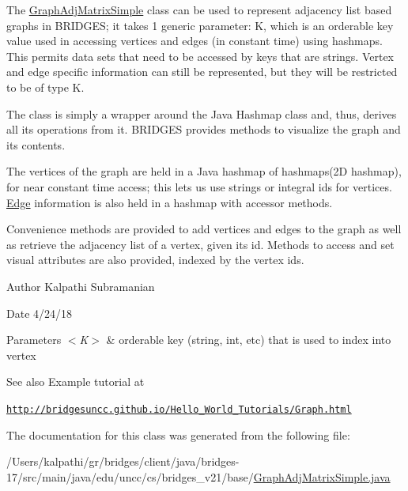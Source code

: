 The \mbox{\hyperlink{classbridges_1_1base_1_1_graph_adj_matrix_simple}{Graph\+Adj\+Matrix\+Simple}} class can be used to represent adjacency list based ~\newline
graphs in B\+R\+I\+D\+G\+ES; it takes 1 generic parameter\+: K, which is an orderable key value used in accessing vertices and edges (in constant time) using hashmaps. This permits data sets that need to be accessed by keys that are strings. Vertex and edge specific information can still be represented, but they will be restricted to be of type K.

The class is simply a wrapper around the Java Hashmap class and, thus, derives all its operations from it. B\+R\+I\+D\+G\+ES provides methods to visualize the graph and its contents.

The vertices of the graph are held in a Java hashmap of hashmaps(2\+D hashmap), for near constant time access; this lets us use strings or integral ids for vertices. \mbox{\hyperlink{classbridges_1_1base_1_1_edge}{Edge}} information is also held in a hashmap with accessor methods.

Convenience methods are provided to add vertices and edges to the graph as well as retrieve the adjacency list of a vertex, given its id. Methods to access and set visual attributes are also provided, indexed by the vertex ids.

\begin{DoxyAuthor}{Author}
Kalpathi Subramanian
\end{DoxyAuthor}
\begin{DoxyDate}{Date}
4/24/18
\end{DoxyDate}

\begin{DoxyParams}{Parameters}
{\em $<$\+K$>$} & orderable key (string, int, etc) that is used to index into vertex\\
\hline
\end{DoxyParams}
\begin{DoxySeeAlso}{See also}
Example tutorial at 
\end{DoxySeeAlso}
\href{http://bridgesuncc.github.io/Hello_World_Tutorials/Graph.html}{\tt http\+://bridgesuncc.\+github.\+io/\+Hello\+\_\+\+World\+\_\+\+Tutorials/\+Graph.\+html} 

The documentation for this class was generated from the following file\+:\begin{DoxyCompactItemize}
\item 
/\+Users/kalpathi/gr/bridges/client/java/bridges-\/17/src/main/java/edu/uncc/cs/bridges\+\_\+v21/base/\mbox{\hyperlink{_graph_adj_matrix_simple_8java}{Graph\+Adj\+Matrix\+Simple.\+java}}\end{DoxyCompactItemize}
